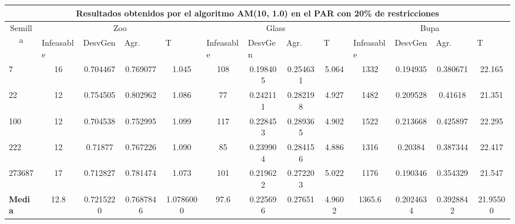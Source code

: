 \begin{table}[H]
\begin{adjustwidth}{-1cm}{-1cm}
	\end{adjustwidth}
	
\end{table}

\begin{table}[H]
	\tiny

	\begin{adjustwidth}{-1cm}{-1cm}%
	
	\begin{tabular}{|l|c|c|c|c|c|c|c|c|c|c|c|c|}
	\hline
	\multicolumn{13}{|c|}{\textbf{Resultados obtenidos por el algoritmo AM(10, 1.0) en el PAR con 20\% de restricciones}}                                                                                                                                                                                                                                                                                                                                            \\ \hline
	\multicolumn{1}{|c|}{\multirow{2}{*}{Semilla}} & \multicolumn{4}{c|}{Zoo}                                                                                          & \multicolumn{4}{c|}{Glass}                                                                                         & \multicolumn{4}{c|}{Bupa}                                                                                          \\ \cline{2-13} 
	\multicolumn{1}{|c|}{}                                  & \multicolumn{1}{l|}{Infeasable} & \multicolumn{1}{l|}{DesvGen} & \multicolumn{1}{l|}{Agr.} & \multicolumn{1}{l|}{T} & \multicolumn{1}{l|}{Infeasable} & \multicolumn{1}{l|}{DesvGen} & \multicolumn{1}{l|}{Agr.} & \multicolumn{1}{l|}{T} & \multicolumn{1}{l|}{Infeasable} & \multicolumn{1}{l|}{DesvGen} & \multicolumn{1}{l|}{Agr.} & \multicolumn{1}{l|}{T} \\ \hline
	7   	& 16 & 0.704467 & 0.769077 & 1.045 &				108 & 0.198405 & 0.254631 & 5.064 &			 	1332 & 0.194935 & 0.380671 & 22.165		\\ \hline
	22 		& 12 & 0.754505 & 0.802962 & 1.086 &				77 & 0.242111 & 0.282198 & 4.927 &		 	1482 & 0.209528 & 0.41618 & 21.351		\\ \hline
	100 	& 12 & 0.704538 & 0.752995 & 1.099 &				117 & 0.228453 & 0.289365 & 4.902 &				1522 & 0.213668 & 0.425897 & 22.295		\\ \hline
	222 	& 12 & 0.71877 & 0.767226 & 1.090 &				85 & 0.239904 & 0.284156 & 4.886 & 			1316 & 0.20384 & 0.387344 & 22.417			\\ \hline
	273687 	& 17 & 0.712827 & 0.781474 & 1.073 &				101 & 0.219622 & 0.272203 & 5.022 &			 1176 & 0.190346 & 0.354329 & 21.547		\\ \hline
	\textbf{Media} &  12.8 & 	0.7215220 & 	0.7687846	 & 1.0786000 & 	97.6 & 	0.225696 & 	0.27651 & 	4.9602 & 	1365.6	 & 0.2024634 & 	0.3928842 & 	21.95500   \\ \hline
	\end{tabular}
	
	\end{adjustwidth}
	
\end{table}

